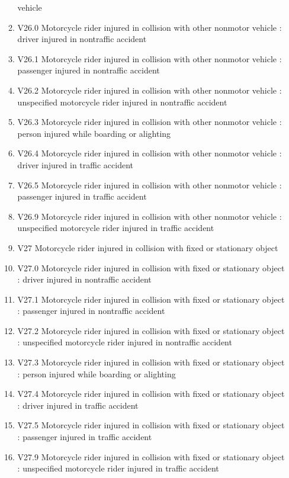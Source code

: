\documentclass[
]{scrartcl}
\begin{document}
\begin{itemize}
\begin{enumerate}
    vehicle
  \item
    V26.0 Motorcycle rider injured in collision with other nonmotor
    vehicle : driver injured in nontraffic accident
  \item
    V26.1 Motorcycle rider injured in collision with other nonmotor
    vehicle : passenger injured in nontraffic accident
  \item
    V26.2 Motorcycle rider injured in collision with other nonmotor
    vehicle : unspecified motorcycle rider injured in nontraffic
    accident
  \item
    V26.3 Motorcycle rider injured in collision with other nonmotor
    vehicle : person injured while boarding or alighting
  \item
    V26.4 Motorcycle rider injured in collision with other nonmotor
    vehicle : driver injured in traffic accident
  \item
    V26.5 Motorcycle rider injured in collision with other nonmotor
    vehicle : passenger injured in traffic accident
  \item
    V26.9 Motorcycle rider injured in collision with other nonmotor
    vehicle : unspecified motorcycle rider injured in traffic accident
  \item
    V27 Motorcycle rider injured in collision with fixed or stationary
    object
  \item
    V27.0 Motorcycle rider injured in collision with fixed or stationary
    object : driver injured in nontraffic accident
  \item
    V27.1 Motorcycle rider injured in collision with fixed or stationary
    object : passenger injured in nontraffic accident
  \item
    V27.2 Motorcycle rider injured in collision with fixed or stationary
    object : unspecified motorcycle rider injured in nontraffic accident
  \item
    V27.3 Motorcycle rider injured in collision with fixed or stationary
    object : person injured while boarding or alighting
  \item
    V27.4 Motorcycle rider injured in collision with fixed or stationary
    object : driver injured in traffic accident
  \item
    V27.5 Motorcycle rider injured in collision with fixed or stationary
    object : passenger injured in traffic accident
  \item
    V27.9 Motorcycle rider injured in collision with fixed or stationary
    object : unspecified motorcycle rider injured in traffic accident

\end{enumerate}
\end{itemize}
\end{document}
